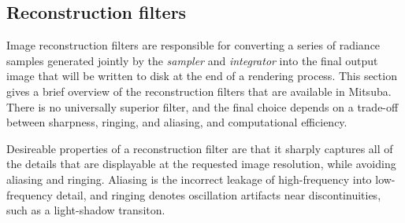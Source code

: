 \newpage
\subsection{Reconstruction filters}
\label{sec:rfilters}
Image reconstruction filters are responsible for converting a series of radiance samples generated
jointly by the \emph{sampler} and \emph{integrator} into the final output image that will be written 
to disk at the end of a rendering process.
This section gives a brief overview of the reconstruction filters that are available in Mitsuba.
There is no universally superior filter, and the final choice depends on a trade-off between
sharpness, ringing, and aliasing, and computational efficiency.

Desireable properties of a reconstruction filter are that it sharply captures all of the details that
are displayable at the requested image resolution, while avoiding aliasing and ringing. Aliasing is
the incorrect leakage of high-frequency into low-frequency detail, and ringing denotes oscillation artifacts
near discontinuities, such as a light-shadow transiton.

